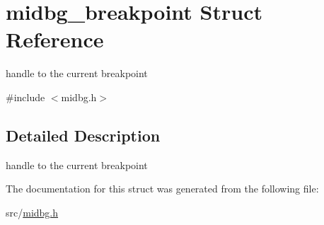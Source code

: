 \hypertarget{structmidbg__breakpoint}{\section{midbg\-\_\-breakpoint Struct Reference}
\label{structmidbg__breakpoint}
}


handle to the current breakpoint  




{\ttfamily \#include $<$midbg.\-h$>$}



\subsection{Detailed Description}
handle to the current breakpoint 

The documentation for this struct was generated from the following file\-:\begin{DoxyCompactItemize}
\item 
src/\hyperlink{midbg_8h}{midbg.\-h}\end{DoxyCompactItemize}
